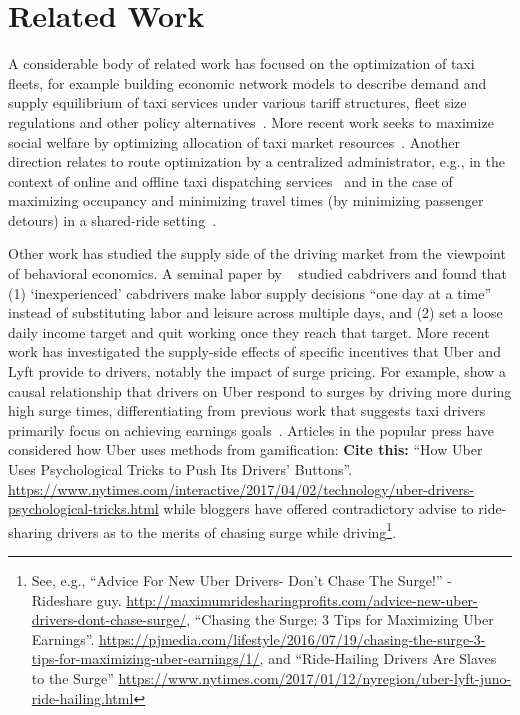 
\section{Related Work}
\label{sec:related_work}

A considerable body of related work has focused on the optimization of taxi fleets, for
example building economic network models to describe demand and supply equilibrium of taxi 
services under various tariff structures, fleet size regulations and other policy
alternatives~\cite{bailey1987simulation,yang2002demand}.  More recent work seeks to 
maximize social welfare by optimizing allocation of taxi market resources~\cite{shi2016optimization}.
Another direction relates to route optimization by a centralized administrator, e.g., in
the context of online and offline taxi dispatching services~\cite{maciejewski2013simulation,nunes2011taxi} 
and in the case of maximizing occupancy and minimizing travel times (by minimizing passenger detours) 
in a shared-ride setting~\cite{jung2013design}.

Other work has studied the supply side of the driving market from the viewpoint of behavioral economics.
A seminal paper by ~\citeauthor{camerer1997labor} studied cabdrivers and found that  (1) `inexperienced' 
cabdrivers make labor supply decisions ``one day at a time'' instead of substituting labor and leisure 
across multiple days, and  (2) set a loose daily income target and quit working once they reach that 
target.  More recent work has investigated the supply-side effects of specific incentives that Uber and Lyft 
provide to drivers, notably the impact of surge pricing.  For example, \citeauthor{chen2016dynamic} show 
a causal relationship that drivers on Uber respond to surges by driving more during high surge times, 
differentiating from previous work that suggests taxi drivers primarily focus on achieving earnings goals~\cite{camerer1997labor}.
Articles in the popular press have considered how Uber uses methods from gamification: {\bf{Cite this:}} ``How Uber Uses Psychological Tricks to Push Its Drivers' Buttons''. \url{https://www.nytimes.com/interactive/2017/04/02/technology/uber-drivers-psychological-tricks.html}
while bloggers have offered contradictory advise to ride-sharing drivers as to the merits of chasing surge while 
driving\footnote{See, e.g., ``Advice For New Uber Drivers- Don't Chase The Surge!'' -Rideshare guy. \url{http://maximumridesharingprofits.com/advice-new-uber-drivers-dont-chase-surge/}, 
``Chasing the Surge: 3 Tips for Maximizing Uber Earnings''. \url{https://pjmedia.com/lifestyle/2016/07/19/chasing-the-surge-3-tips-for-maximizing-uber-earnings/1/}, and 
``Ride-Hailing Drivers Are Slaves to the Surge'' {\url{https://www.nytimes.com/2017/01/12/nyregion/uber-lyft-juno-ride-hailing.html}}}.



